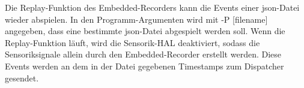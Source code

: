 Die Replay-Funktion des Embedded-Recorders kann die Events einer json-Datei wieder abspielen.
In den Programm-Argumenten wird mit -P [filename] angegeben, dass eine bestimmte json-Datei abgespielt werden soll.
Wenn die Replay-Funktion läuft, wird die Sensorik-HAL deaktiviert,
sodass die Sensoriksignale allein durch den Embedded-Recorder erstellt werden.
Diese Events werden an dem in der Datei gegebenen Timestamps zum Dispatcher gesendet.

